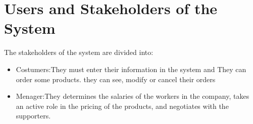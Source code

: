 \section{Users and Stakeholders of the System}
The stakeholders of the system are divided into:
\begin{itemize}
	\item Costumers:They must enter their information in the system and They can order some products. they can see, modify or cancel their orders
	\item Menager:They determines the salaries of the workers in the company, takes an active role in the pricing of the products, and negotiates with the supporters.
\end{itemize}